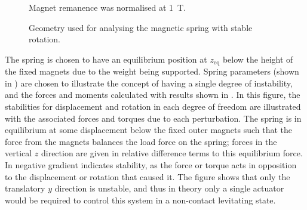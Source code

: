 \documentclass[11pt,a4paper]{memoir}
\begin{document}
\begin{figure}[t]
  \begin{subfigure}[0.4]
  \end{subfigure}\hfil
  \begin{subfigure}[0.4]
  \end{subfigure}
  \caption{Geometry used for analysing the magnetic spring with stable rotation.}{ Magnet remanence was normalised at \SI{1}{T}.}
\end{figure}

The spring is chosen to have an equilibrium position at $z_{\text{eq}}$ below the height of the fixed magnets due to the weight being supported.
Spring parameters (shown in ) are chosen to illustrate the concept of having a single degree of instability, and the forces and moments calculated with results shown in .
In this figure, the stabilities for displacement and rotation in each degree of freedom are illustrated with the associated forces and torques due to each perturbation.
The spring is in equilibrium at some displacement below the fixed outer magnets such that the force from the magnets balances the load force on the spring; forces in the vertical $z$ direction are given in relative difference terms to this equilibrium force.
In  negative gradient indicates stability, as the force or torque acts in opposition to the displacement or rotation that caused it.
The figure shows that only the translatory $y$ direction is unstable, and thus in theory only a single actuator would be required to control this system in a non-contact levitating state.

\begin{figure}
\end{figure}
\end{document}

